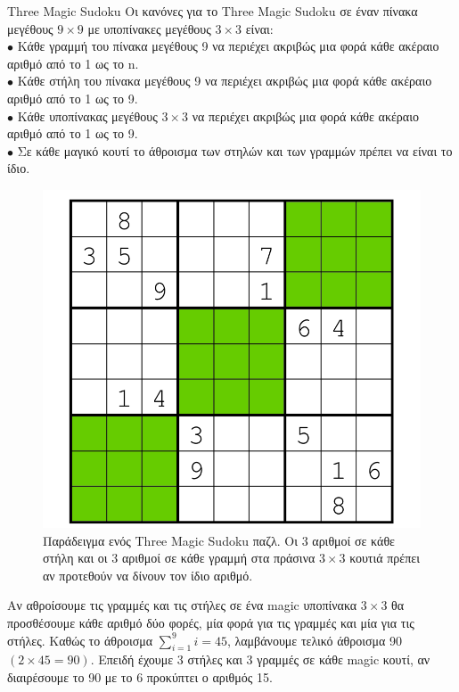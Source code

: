 \documentclass[oneside,12pt]{book}
\theoremstyle{definition}
\begin{document}
\begin{mytheorem}{Three Magic Sudoku}{}
	Οι κανόνες για το Three Magic Sudoku σε έναν πίνακα μεγέθους \(9 \times 9\) με υποπίνακες μεγέθους \(3 \times 3\) είναι: \\
	\(\bullet\) Κάθε γραμμή του πίνακα μεγέθους 9 να περιέχει ακριβώς μια φορά κάθε ακέραιο αριθμό από το 1 ως το n. \\
	\(\bullet\) Κάθε στήλη του πίνακα μεγέθους 9 να περιέχει ακριβώς μια φορά κάθε ακέραιο αριθμό από το 1 ως το 9. \\
	\(\bullet\) Κάθε υποπίνακας μεγέθους \(3 \times 3\) να περιέχει ακριβώς μια φορά κάθε ακέραιο αριθμό από το 1 ως το 9. \\
	\(\bullet\) Σε κάθε μαγικό κουτί το άθροισμα των στηλών και των γραμμών πρέπει να είναι το ίδιο.
\end{mytheorem}

\begin{figure}[h]
	\centering
	\includegraphics[scale=0.4]{Figures/threemagicSUDOKU.png}
	\caption{Παράδειγμα ενός Three Magic Sudoku παζλ. Οι 3 αριθμοί σε κάθε στήλη και οι 3 αριθμοί σε κάθε γραμμή στα πράσινα \(3 \times 3\) κουτιά πρέπει αν προτεθούν να δίνουν τον ίδιο αριθμό.}
\end{figure}

Αν αθροίσουμε τις γραμμές και τις στήλες σε ένα magic υποπίνακα \(3 \times 3\) θα προσθέσουμε κάθε αριθμό δύο φορές, μία φορά για τις γραμμές και μία για τις στήλες. Καθώς το άθροισμα \(\sum_{i=1}^{9}{i} = 45\), λαμβάνουμε τελικό άθροισμα 90 \(\left(2 \times 45 = 90\right)\). Επειδή έχουμε 3 στήλες και 3 γραμμές σε κάθε magic κουτί, αν διαιρέσουμε το 90 με το 6 προκύπτει ο αριθμός 15. \par
\end{document}

